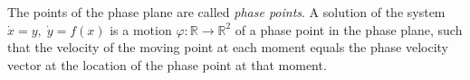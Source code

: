 The points of the phase plane are called \textit{phase points}.
A solution of the system $\dot{x} = y,\; \dot{y} = f(x)$ is a motion $\varphi: \mathbb{R} \to \mathbb{R}^2$ of a phase point in the phase plane, such that the velocity of the moving point at each moment equals the phase velocity vector at the location of the phase point at that moment.
